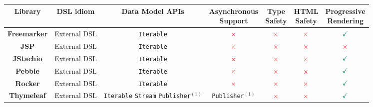 \begin{table}[h]
  \small
  \tabcolsep=0.1cm
  \def\arraystretch{1.2}
  \begin{tabular}{|c|c|c|c|c|c|c|}
    \hline
    \textbf{Library}
     & \textbf{DSL idiom}
     & \textbf{Data Model APIs}
     & \shortstack{\textbf{Asynchronous} \\\textbf{Support}}
     & \shortstack{\textbf{Type}         \\\textbf{Safety}}
     & \shortstack{\textbf{HTML}         \\\textbf{Safety}}
     & \shortstack{\textbf{Progressive}  \\\textbf{Rendering}}
    \\
    \hline
    \textbf{Freemarker}
     & External DSL
     & \texttt{Iterable}
     & \large{$\textcolor{red}{\times}$}
     & \large{$\textcolor{red}{\times}$}
     & \large{$\textcolor{red}{\times}$}
     & \large{$\textcolor{PineGreen}{\checkmark}$}
    \\
    \hline
    \textbf{JSP}
     & External DSL
     & \texttt{Iterable}
     & \large{$\textcolor{red}{\times}$}
     & \large{$\textcolor{red}{\times}$}
     & \large{$\textcolor{red}{\times}$}
     & \large{$\textcolor{red}{\times}$}
    \\
    \hline
    \textbf{JStachio}
     & External DSL
     & \texttt{Iterable}
     & \large{$\textcolor{red}{\times}$}
     & \large{$\textcolor{red}{\times}$}
     & \large{$\textcolor{red}{\times}$}
     & \large{$\textcolor{PineGreen}{\checkmark}$}
    \\\hline
    \textbf{Pebble}
     & External DSL
     & \texttt{Iterable}
     & \large{$\textcolor{red}{\times}$}
     & \large{$\textcolor{red}{\times}$}
     & \large{$\textcolor{red}{\times}$}
     & \large{$\textcolor{PineGreen}{\checkmark}$}
    \\
    \hline
    \textbf{Rocker}
     & External DSL
     & \texttt{Iterable}
     & \large{$\textcolor{red}{\times}$}
     & \large{$\textcolor{red}{\times}$}
     & \large{$\textcolor{red}{\times}$}
     & \large{$\textcolor{PineGreen}{\checkmark}$}
    \\
    \hline
    \textbf{Thymeleaf}
     & External DSL
     & \shortstack{\texttt{Iterable} \\\texttt{Stream} \\\texttt{Publisher}$^{(1)}$}
     & \texttt{Publisher}$^{(1)}$
     & \large{$\textcolor{red}{\times}$}
     & \large{$\textcolor{red}{\times}$}
     & \large{$\textcolor{PineGreen}{\checkmark}$}
    \\

\end{tabular}
\end{table}
